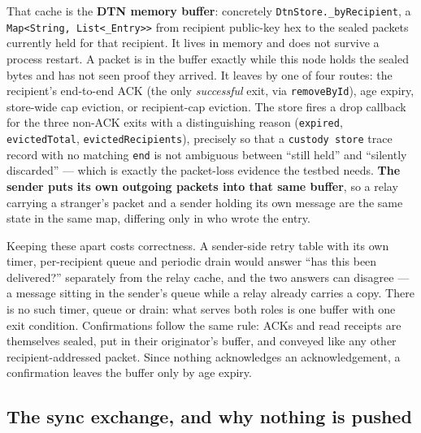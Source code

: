 \documentclass[11pt]{report}
\newcommand{\code}[1]{\texttt{\small #1}}
\begin{document}
That cache is the \textbf{DTN memory buffer}: concretely \code{DtnStore.\_byRecipient}, a \code{Map<String, List<\_Entry>{}>} from recipient public-key hex to the sealed packets currently held for that recipient. It lives in memory and does not survive a process restart. A packet is in the buffer exactly while this node holds the sealed bytes and has not seen proof they arrived. It leaves by one of four routes: the recipient's end-to-end ACK (the only \emph{successful} exit, via \code{removeById}), age expiry, store-wide cap eviction, or recipient-cap eviction. The store fires a drop callback for the three non-ACK exits with a distinguishing reason (\code{expired}, \code{evictedTotal}, \code{evictedRecipients}), precisely so that a \code{custody store} trace record with no matching \code{end} is not ambiguous between ``still held'' and ``silently discarded'' --- which is exactly the packet-loss evidence the testbed needs. \textbf{The sender puts its own outgoing packets into that same buffer}, so a relay carrying a stranger's packet and a sender holding its own message are the same state in the same map, differing only in who wrote the entry.

Keeping these apart costs correctness. A sender-side retry table with its own timer, per-recipient queue and periodic drain would answer ``has this been delivered?'' separately from the relay cache, and the two answers can disagree --- a message sitting in the sender's queue while a relay already carries a copy. There is no such timer, queue or drain: what serves both roles is one buffer with one exit condition. Confirmations follow the same rule: ACKs and read receipts are themselves sealed, put in their originator's buffer, and conveyed like any other recipient-addressed packet. Since nothing acknowledges an acknowledgement, a confirmation leaves the buffer only by age expiry.

\subsection*{The sync exchange, and why nothing is pushed}
\end{document}
